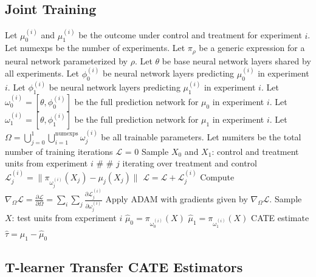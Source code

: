 \subsection{Joint Training}

\begin{algorithm}[!htp]
\caption{Joint Training}
\label{alg:joint-training}
\begin{algorithmic}[1]
\STATE Let $\mu_0^{(i)}$ and $\mu_1^{(i)}$ be the outcome under control and treatment for experiment $i$. 
\STATE Let numexps be the number of experiments. 
\STATE Let $\pi_\rho$ be a generic expression for a neural network parameterized by $\rho$. 
\STATE Let $\theta$ be base neural network layers shared by all experiments. 
\STATE Let $\phi_0^{(i)}$  be neural network layers predicting $\mu_0^{(i)}$ in experiment $i$.
\STATE Let $\phi_1^{(i)}$  be neural network layers predicting $\mu_1^{(i)}$ in experiment $i$.
\STATE Let $\omega_0^{(i)} = \left[\theta, \phi_0^{(i)} \right]$ be the full prediction network for $\mu_0$ in experiment $i$.
\STATE Let $\omega_1^{(i)} = \left[\theta, \phi_1^{(i)} \right]$ be the full prediction network for $\mu_1$ in experiment $i$.
\STATE Let $\Omega = \bigcup_{j=0}^{\text{1}} \bigcup_{i=1}^{\text{numexps}} \omega_j^{(i)}$ be all trainable parameters. 
\STATE Let numiters be the total number of training iterations
\STATE $\mathcal{L}$ = 0
\STATE Sample $X_0$ and $X_1$: control and treatment units from experiment $i$
\STATE \# \# $j$ iterating over treatment and control
\STATE $\mathcal{L}_j^{(i)} = \| \pi_{\omega_j^{(i)}} (X_j) - \mu_j(X_j) \|$
\STATE $\mathcal{L} = \mathcal{L} + \mathcal{L}_j^{(i)}$
\ENDFOR
\ENDFOR
\STATE Compute $\nabla_\Omega \mathcal{L} = \frac{\partial \mathcal{L}}{\partial \Omega} = \sum_i \sum_j \frac{\partial \mathcal{L}_j^{(i)}}{\partial \omega_j^{(i)}}$
\STATE Apply ADAM with gradients given by $\nabla_\Omega \mathcal{L}$. 
\STATE Sample $X$: test units from experiment $i$
\ENDFOR
\ENDFOR
\STATE $\hat{\mu}_0 = \pi_{\omega_0^{(i)}} (X)$
\STATE $\hat{\mu}_1 = \pi_{\omega_1^{(i)}}(X)$
 CATE estimate $\hat{\tau} = \hat{\mu}_1 - \hat{\mu}_0$
\end{algorithmic}
\end{algorithm}


\subsection{T-learner Transfer CATE Estimators}

